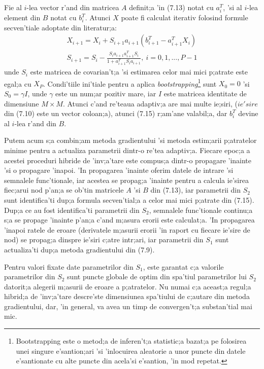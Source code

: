 \par
Fie al $i$-lea vector r'and din matricea $A$ definit;a 'in (7.13) notat cu $a_{i}^{T}$, 'si al $i$-lea element din $B$ notat cu $b_{i}^{T}$. Atunci $X$ poate fi calculat iterativ folosind formule secven'tiale adoptate din literatur;a:
\begin{equation}
\begin{aligned}
X_{i+1} = X_{i} + S_{i+1}a_{i+1}(b_{i+1}^{T} - a_{i+1}^{T}X_{i}) \\
S_{i+1} = S_{i} - \frac {S_{i}a_{i+1}a_{i+1}^{T}S_{i}} {1 + a_{i+1}^{T}S_{i}a_{i+1}},\  i = 0, 1, ..., P-1
\end{aligned}
\end{equation}
unde $S_{i}$ este matricea de covarian't;a 'si estimarea celor mai mici p;atrate este egal;a cu $X_{P}$. Condi'tiile ini'tiale pentru a aplica \textit{bootstrapping}\footnote {Bootstrapping este o metod;a de inferen't;a statistic;a bazat;a pe folosirea unei singure e'santion;ari 'si 'inlocuirea  aleatorie a unor puncte din datele e'santionate cu alte puncte din acela'si e'santion, 'in mod repetat.} sunt $X_{0} = 0$ 'si $S_{0} = \gamma I$, unde $\gamma$ este un num;ar pozitiv mare, iar $I$ este matricea identitate de dimensiune $M \times M$.
Atunci c'and re'teaua adaptiv;a are mai multe ie;siri, ($ie'sire$ din (7.10) este un vector coloan;a), atunci (7.15) r;am'ane valabil;a, dar $b_{i}^{T}$ devine al $i$-lea r'and din $B$.
\par
Putem acum s;a combin;am metoda gradientului 'si metoda estim;arii p;atratelor minime pentru a actualiza parametrii dintr-o re'tea adaptiv;a. Fiecare epoc;a a acestei proceduri hibride de 'inv;a'tare este compus;a dintr-o propagare 'inainte 'si o propagare 'inapoi. 'In propagarea 'inainte oferim datele de intrare 'si semnalele func'tionale, iar acestea se propag;a 'inainte pentru a calcula ie'sirea fiec;arui nod p'an;a se ob'tin matricele $A$ 'si $B$ din (7.13), iar parametrii din $S_{2}$ sunt identifica'ti dup;a formula secven'tial;a a celor mai mici p;atrate din (7.15). Dup;a ce au fost identifica'ti parametrii din $S_{2}$, semnalele func'tionale continu;a s;a se propage 'inainte p'an;a c'and m;asura erorii este calculat;a. 'In propagarea 'inapoi ratele de eroare (derivatele m;asurii erorii 'in raport cu fiecare ie'sire de nod) se propag;a dinspre ie'siri c;atre intr;ari, iar parametrii din $S_{1}$ sunt actualiza'ti dup;a metoda gradientului din (7.9).
\par
Pentru valori fixate date parametrilor din $S_{1}$, este garantat c;a valorile parametrilor din $S_{2}$ sunt puncte globale de optim din spa'tiul parametrilor lui $S_{2}$ datorit;a alegerii m;asurii de eroare a p;atratelor. Nu numai c;a aceast;a regul;a hibrid;a de 'inv;a'tare descre'ste dimensiunea spa'tiului de c;autare din metoda gradientului, dar, 'in general, va avea un timp de convergen't;a substan'tial mai mic.
